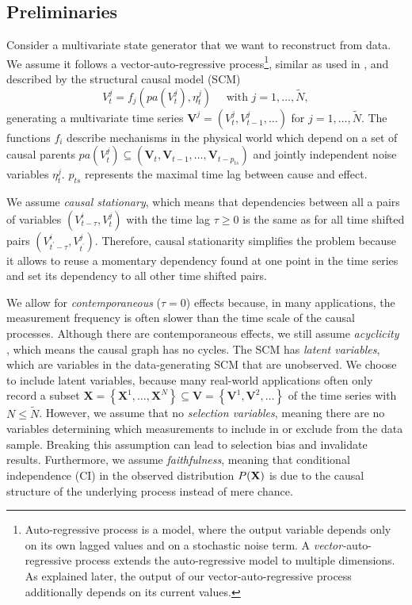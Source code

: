 \documentclass[conference]{IEEEtran}
\begin{document}
\subsection{Preliminaries}
Consider a multivariate state generator that we want to reconstruct from data.
We assume it follows a vector-auto-regressive process\footnote{Auto-regressive process is a model, where the output variable depends only on its own lagged values and on a stochastic noise term. A \textit{vector-}auto-regressive process extends the auto-regressive model to multiple dimensions. As explained later, the output of our vector-auto-regressive process additionally depends on its current values.}, similar as used in \cite{gerhardus_high-recall_2021}, and described by the structural causal model (SCM)
\begin{equation}
V_{t}^{j}=f_{j}\left(pa\left(V_{t}^{j}\right), \eta_{t}^{j}\right) \quad \text { with } j=1, \ldots, \tilde{N},
\end{equation}
generating a multivariate time series $\mathbf{V}^{j}=\left(V_{t}^{j}, V_{t-1}^{j}, \ldots\right)$ for $j=1, \ldots, \tilde{N}$.
The functions $f_i$ describe mechanisms in the physical world which depend on a set of causal parents $p a\left(V_{t}^{j}\right) \subseteq\left(\mathbf{V}_{t}, \mathbf{V}_{t-1}, \ldots, \mathbf{V}_{t-p_{t s}}\right)$ and jointly independent noise variables $\eta_{t}^{j}$. $p_{t s}$ represents the maximal time lag between cause and effect.

We assume \textit{causal stationary}, which means that dependencies between all a pairs of variables $\left(V_{t-\tau}^{i}, V_{t^{}}^{j}\right)$ with the time lag $\tau \geq 0$ is the same as for all time shifted pairs $\left(V_{t^{\prime}-\tau}^{i}, V_{t^{\prime}}^{j}\right)$\cite{runge_causal_2018}. Therefore, causal stationarity simplifies the problem because it allows to reuse a momentary dependency found at one point in the time series and set its dependency to all other time shifted pairs.

We allow for \textit{contemporaneous} ($\tau=0$) effects because, in many applications, the measurement frequency is often slower than the time scale of the causal processes. Although there are contemporaneous effects, we still assume \textit{acyclicity}
, which means the causal graph has no cycles.
The SCM has \textit{latent variables}, which are variables in the data-generating SCM that are unobserved. We choose to include latent variables, because many real-world applications often only record a subset $\mathbf{X}=\left\{\mathbf{X}^{1}, \ldots, \mathbf{X}^{N}\right\} \subseteq \mathbf{V}=\left\{\mathbf{V}^{1}, \mathbf{V}^{2}, \ldots\right\}$ of the time series with $N \leq \tilde{N}$. 
However, we assume that no \textit{selection variables}, meaning there are no variables determining which measurements to include in or exclude from the data sample. Breaking this assumption can lead to selection bias and invalidate results.
Furthermore, we assume \textit{faithfulness}, meaning that conditional independence (CI) in the observed distribution $P(\bf{X})$ is due to the causal structure of the underlying process instead of mere chance\cite{gerhardus_high-recall_2021}.
\end{document}

